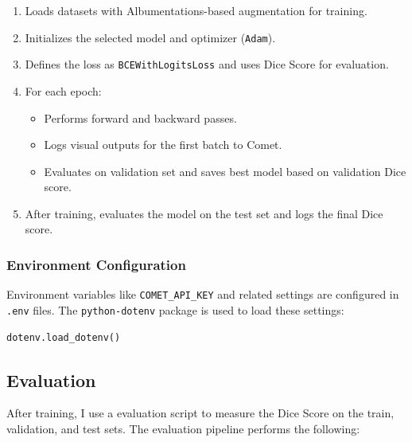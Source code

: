 \documentclass{homework}
\begin{document}
\begin{enumerate}
    \item Loads datasets with Albumentations-based augmentation for training.
    \item Initializes the selected model and optimizer (\lstinline{Adam}).
    \item Defines the loss as \lstinline{BCEWithLogitsLoss} and uses Dice Score for evaluation.
    \item For each epoch:
    \begin{itemize}
        \item Performs forward and backward passes.
        \item Logs visual outputs for the first batch to Comet.
        \item Evaluates on validation set and saves best model based on validation Dice score.
    \end{itemize}
    \item After training, evaluates the model on the test set and logs the final Dice score.
\end{enumerate}

\subsubsection{Environment Configuration}
Environment variables like \lstinline{COMET_API_KEY} and related settings are configured in \lstinline{.env} files. The \lstinline{python-dotenv} package is used to load these settings:

\begin{lstlisting}[language=Python]
dotenv.load_dotenv()
\end{lstlisting}

\subsection{Evaluation}

After training, I use a evaluation script to measure the Dice Score on the train, validation, and test sets. The evaluation pipeline performs the following:
\end{document}
